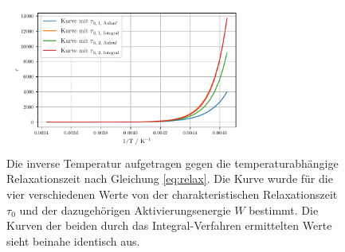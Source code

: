 \begin{figure}
    \centering
    \includegraphics[width=0.7\textwidth]{figures/tau.pdf}
    \caption{Die inverse Temperatur aufgetragen gegen die temperaturabhängige Relaxationszeit nach Gleichung \eqref{eq:relax}. Die Kurve wurde für die vier verschiedenen Werte von der charakteristischen Relaxationszeit $\tau_0$ und der dazugehörigen Aktivierungsenergie $W$ bestimmt. Die Kurven der beiden durch das Integral-Verfahren ermittelten Werte sieht beinahe identisch aus.}
    \label{abb:tau}
\end{figure}

